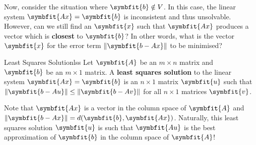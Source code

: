 \documentclass[math]{amznotes}
\theoremstyle{remark}
\begin{document}
Now, consider the situation where $\symbfit{b} \notin V$. In this case, the linear system $\symbfit{Ax} = \symbfit{b}$ is inconsistent and thus unsolvable. However, can we still find an $\symbfit{x}$ such that $\symbfit{Ax}$ produces a vector which is {\color{red} \textbf{closest}} to $\symbfit{b}$? In other words, what is the vector $\symbfit{x}$ for the error term $\left\lVert\symbfit{b - Ax}\right\rVert$ to be minimised?
\begin{dfnbox}{Least Squares Solution}{lss}
    Let $\symbfit{A}$ be an $m \times n$ matrix and $\symbfit{b}$ be an $m \times 1$ matrix. A {\color{red} \textbf{least squares solution}} to the linear system $\symbfit{Ax} = \symbfit{b}$ is an $n \times 1$ matrix $\symbfit{u}$ such that $\left\lVert \symbfit{b - Au} \right\rVert \leq \left\lVert \symbfit{b - Av} \right\rVert$ for all $n \times 1$ matrices $\symbfit{v}$.
\end{dfnbox}
Note that $\symbfit{Ax}$ is a vector in the column space of $\symbfit{A}$ and $\left\lVert\symbfit{b - Ax}\right\rVert = d(\symbfit{b}, \symbfit{Ax})$. Naturally, this least squares solution $\symbfit{u}$ is such that $\symbfit{Au}$ is the best approximation of $\symbfit{b}$ in the column space of $\symbfit{A}$!
\end{document}
